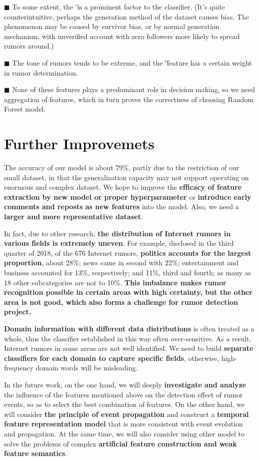 \documentclass[12pt,a4paper]{article}
\begin{document}
 \setlength{\hangindent}{4em}
$\blacksquare$ To some extent, the \'\' is a prominent factor to the classifier. (It’s quite counterintuitive, perhaps the generation method of the dataset causes bias. The phenomenon may be caused by survivor bias, or by normal generation mechanism, with unverified account with zero followers more likely to spread rumors around.)

 \setlength{\hangindent}{4em}
$\blacksquare$ The tone of rumors tends to be extreme, and the \'\' feature has a certain weight in rumor determination. 

 \setlength{\hangindent}{4em}
$\blacksquare$ None of these features plays a predominant role in decision making, so we need aggregation of features, which in turn proves the correctness of choosing Random Forest model. 
\vspace{-15pt}
\section{Further Improvemets}
The accuracy of our model is about 79\%, partly due to the restriction of our small dataset, in that the generalization capacity may not support operating on enormous and complex dataset. We hope to improve the \textbf{efficacy of feature extraction by new model or proper hyperparameter} or \textbf{introduce early comments and reposts as new features} into the model. Also, we need a \textbf{larger and more representative dataset}.

In fact, due to other research, \textbf{the distribution of Internet rumors in various fields is extremely uneven}. For example, disclosed in the third quarter of 2018, of the 676 Internet rumors, \textbf{politics accounts for the largest proportion}, about 28\%; news came in second with 22\%; entertainment and business accounted for 13\%, respectively; and 11\%, third and fourth; as many as 18 other subcategories are not to 10\%. \textbf{This imbalance makes rumor recognition possible in certain areas with high certainty, but the other area is not good, which also forms a challenge for rumor detection project.}

\textbf{Domain information with different data distributions} is often treated as a whole, thus the classifier established in this way often over-sensitive. As a result, Internet rumors in some areas are not well identified. We need to build \textbf{separate classifiers for each domain to capture specific fields}, otherwise, high-frequency domain words will be misleading. 

In the future work, on the one hand, we will deeply \textbf{investigate and analyze} the influence of the features mentioned above on the detection effect of rumor events, so as to select the best combination of features. On the other hand, we will consider \textbf{the principle of event propagation} and construct a \textbf{temporal feature representation model} that is more consistent with event evolution and propagation. At the same time, we will also consider using other model to solve the problems of complex \textbf{artificial feature construction and weak feature semantics}.
\end{document}
